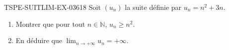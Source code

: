 \begin{exercice}{TSPE-SUITLIM-EX-036}{1}{8}
Soit $(u_n)$ la suite définie par $u_n = n^2 + 3n$.
\begin{enumerate}
  \item Montrer que pour tout $n \in \mathbb{N}$, $u_n \geq n^2$.
  \item En déduire que $\lim_{n \to +\infty} u_n = +\infty$.
\end{enumerate}
\end{exercice}
